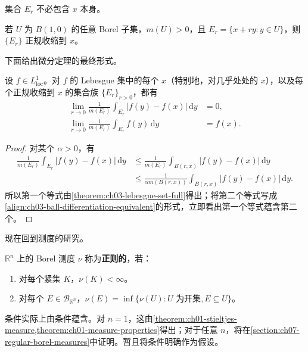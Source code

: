 \documentclass[../../main.tex]{subfiles}%
\begin{document}
\begin{remark}
集合 $E_r$ 不必包含 $x$ 本身。
\end{remark}
\begin{example}\label{example:ch03-shrink-nicely}
若 $U$ 为 $B(1,0)$ 的任意 Borel 子集，$m(U)>0$，且 $E_r=\{x+ry:y\in U\}$，则 $\{E_r\}$ 正规收缩到 $x$。
\end{example}
下面给出微分定理的最终形式。
\begin{theorem}\label{theorem:ch03-lebesgue-differentiation}
设 $f\in L^1_{\mathrm{loc}}$。对 $f$ 的 Lebesgue 集中的每个 $x$（特别地，对几乎处处的 $x$），以及每个正规收缩到 $x$ 的集合族 $\{E_r\}_{r>0}$，都有
\begin{align*}
\lim_{r\to0}\frac{1}{m(E_r)}\int_{E_r}|f(y)-f(x)|\,\mathrm{d}y&=0,\\
\lim_{r\to0}\frac{1}{m(E_r)}\int_{E_r}f(y)\,\mathrm{d}y&=f(x).
\end{align*}
\end{theorem}
\begin{proof}
对某个 $\alpha>0$，有
\begin{align*}
\frac{1}{m(E_r)}\int_{E_r}|f(y)-f(x)|\,\mathrm{d}y
&\le\frac{1}{m(E_r)}\int_{B(r,x)}|f(y)-f(x)|\,\mathrm{d}y\\
&\le\frac{1}{\alpha m(B(r,x))}\int_{B(r,x)}|f(y)-f(x)|\,\mathrm{d}y.
\end{align*}
所以第一个等式由\cref{theorem:ch03-lebesgue-set-full}得出；将第二个等式写成\eqref{align:ch03-ball-differentiation-equivalent}的形式，立即看出第一个等式蕴含第二个。
\end{proof}
现在回到测度的研究。
\begin{definition}[正则 Borel 测度]\label{definition:ch03-regular-borel-measure}
$\mathbb{R}^n$ 上的 Borel 测度 $\nu$ 称为\textbf{正则的}，若：
\begin{enumerate}[label=(\roman*)]
\item\label{item:ch03-regular-finite-compact} 对每个紧集 $K$，$\nu(K)<\infty$。
\item\label{item:ch03-regular-outer} 对每个 $E\in\mathscr{B}_{\mathbb{R}^n}$，$\nu(E)=\inf\{\nu(U):U\text{ 为开集},E\subseteq U\}$。
\end{enumerate}
\end{definition}
\begin{remark}
条件实际上由条件蕴含。对 $n=1$，这由\cref{theorem:ch01-stieltjes-measure,theorem:ch01-measure-properties}得出；对于任意 $n$，将在\cref{section:ch07-regular-borel-measures}中证明。暂且将条件明确作为假设。
\end{remark}
\end{document}
